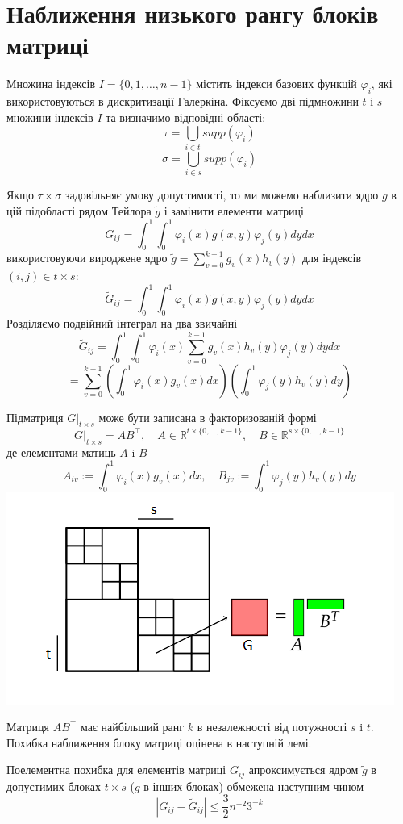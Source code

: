\documentclass[12pt]{report}
\begin{document}
	\section{Наближення низького рангу блоків матриці}
	\par Множина індексів $I=\{0,1,\dots,n-1\}$ містить індекси базових функцій $\varphi_i$, які використовуються в дискритизації Галеркіна. Фіксуємо дві підмножини $t$ і $s$ множини індексів $I$ та визначимо відповідні області:
	$$\tau=\bigcup_{i\in t}supp(\varphi_i)$$
	$$\sigma=\bigcup_{i\in s}supp(\varphi_i)$$
	\par Якщо $\tau\times\sigma$ задовільняє умову допустимості, то ми можемо наблизити ядро $g$ в цій підобласті рядом Тейлора $\tilde{g}$ і замінити елементи матриці
	$$G_{ij}=\int_{0}^{1}\int_{0}^{1}\varphi_i(x)g(x,y)\varphi_j(y)dydx$$
	використовуючи вироджене ядро $\tilde{g}=\sum_{v=0}^{k-1}g_v(x)h_v(y)$ для індексів $(i,j)\in t\times s$:
	$$\tilde{G}_{ij}=\int_{0}^{1}\int_{0}^{1}\varphi_i(x)\tilde{g}(x,y)\varphi_j(y)dydx$$
	Розділяємо подвійний інтеграл на два звичайні
	$$\tilde{G}_{ij}=\int_{0}^{1}\int_{0}^{1}\varphi_i(x)\sum_{v=0}^{k-1}g_v(x)h_v(y)\varphi_j(y)dydx $$
	$$=\sum_{v=0}^{k-1}(\int_{0}^{1}\varphi_i(x)g_v(x)dx)(\int_{0}^{1}\varphi_j(y)h_v(y)dy)$$
	\par Підматриця $G|_{t\times s}$ може бути записана в факторизованій формі
	$$G|_{t\times s}=AB^\top,\quad A\in\mathbb{R}^{t\times\{0,\dots,k-1\}},\quad B\in\mathbb{R}^{s\times\{0,\dots,k-1\}}$$
	де елементами матиць $A$ i $B$  
	$$A_{iv}:=\int_{0}^{1}\varphi_i(x)g_v(x)dx, \quad B_{jv}:=\int_{0}^{1}\varphi_j(y)h_v(y)dy$$
	\includegraphics{1_6}
	\par Матриця $AB^\top$ має найбільший ранг $k$ в незалежності від потужності $s$ i $t$. Похибка наближення блоку матриці оцінена в наступній лемі.
	\begin{Lem}
	Поелементна похибка для елементів матриці $G_{ij}$ апроксимується ядром $\tilde{g}$ в допустимих блоках $t\times s$ ($g$ в інших блоках) обмежена наступним чином
	$$|G_{ij}-\tilde{G}_{ij}|\le \frac{3}{2}n^{-2}3^{-k}$$
	\end{Lem}
\end{document}
